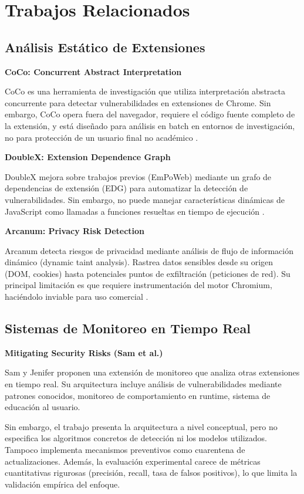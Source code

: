 \documentclass[12pt,oneside]{report}
\begin{document}
\section{Trabajos Relacionados}

\subsection{Análisis Estático de Extensiones}

\textbf{CoCo: Concurrent Abstract Interpretation}

CoCo es una herramienta de investigación que utiliza interpretación abstracta concurrente para detectar vulnerabilidades en extensiones de Chrome. Sin embargo, CoCo opera fuera del navegador, requiere el código fuente completo de la extensión, y está diseñado para análisis en batch en entornos de investigación, no para protección de un usuario final no académico \cite{yu2023coco}.

\textbf{DoubleX: Extension Dependence Graph}

DoubleX mejora sobre trabajos previos (EmPoWeb) mediante un grafo de dependencias de extensión (EDG) para automatizar la detección de vulnerabilidades. Sin embargo, no puede manejar características dinámicas de JavaScript como llamadas a funciones resueltas en tiempo de ejecución \cite{doublex}.

\textbf{Arcanum: Privacy Risk Detection}

Arcanum detecta riesgos de privacidad mediante análisis de flujo de información dinámico (dynamic taint analysis). Rastrea datos sensibles desde su origen (DOM, cookies) hasta potenciales puntos de exfiltración (peticiones de red). Su principal limitación es que requiere instrumentación del motor Chromium, haciéndolo inviable para uso comercial \cite{arcanum}.

\subsection{Sistemas de Monitoreo en Tiempo Real}

\textbf{Mitigating Security Risks (Sam et al.) \cite{sam2023mitigating}}

Sam y Jenifer proponen una extensión de monitoreo que analiza otras extensiones en tiempo real. Su arquitectura incluye análisis de vulnerabilidades mediante patrones conocidos, monitoreo de comportamiento en runtime, sistema de educación al usuario. 

Sin embargo, el trabajo presenta la arquitectura a nivel conceptual, pero no especifica los algoritmos concretos de detección ni los modelos utilizados. Tampoco implementa mecanismos preventivos como cuarentena de actualizaciones. Además, la evaluación experimental carece de métricas cuantitativas rigurosas (precisión, recall, tasa de falsos positivos), lo que limita la validación empírica del enfoque.
\end{document}
